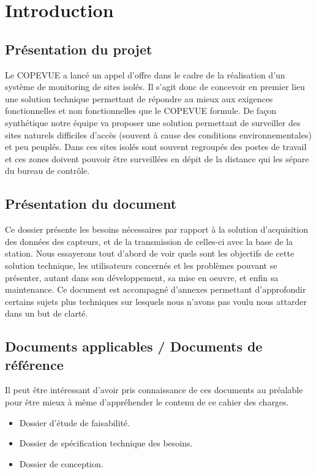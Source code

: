 ﻿\section{Introduction}

\subsection{Présentation du projet}

Le COPEVUE a lancé un appel d'offre dans le cadre de la réalisation d'un système de monitoring de sites isolés. Il s'agit donc de concevoir en premier lieu une solution technique permettant de répondre au mieux aux exigences fonctionnelles et non fonctionnelles que le COPEVUE formule. De façon synthétique notre équipe va proposer une solution permettant de surveiller des sites naturels difficiles d'accès (souvent à cause des conditions environnementales) et peu peuplés. Dans ces sites isolés sont souvent regroupés des postes de travail et ces zones doivent pouvoir être surveillées en dépit de la distance qui les sépare du bureau de contrôle.

\subsection{Présentation du document}

Ce dossier présente les besoins nécessaires par rapport à la solution d'acquisition des données des capteurs, et de la transmission de celles-ci avec la base de la station. Nous essayerons tout d'abord de voir quels sont les objectifs de cette solution technique, les utilisateurs concernés et les problèmes pouvant se présenter, autant dans son développement, sa mise en oeuvre, et enfin sa maintenance. Ce document est accompagné d'annexes permettant d'approfondir certains sujets plus techniques sur lesquels nous n'avons pas voulu nous attarder dans un but de clarté.

\subsection{Documents applicables / Documents de référence}

Il peut être intéressant d'avoir pris connaissance de ces documents au préalable pour être mieux à même d'appréhender le contenu de ce cahier des charges.

\begin{itemize}
\item Dossier d'étude de faisabilité.
\item Dossier de spécification technique des besoins.
\item Dossier de conception.
\end{itemize}

